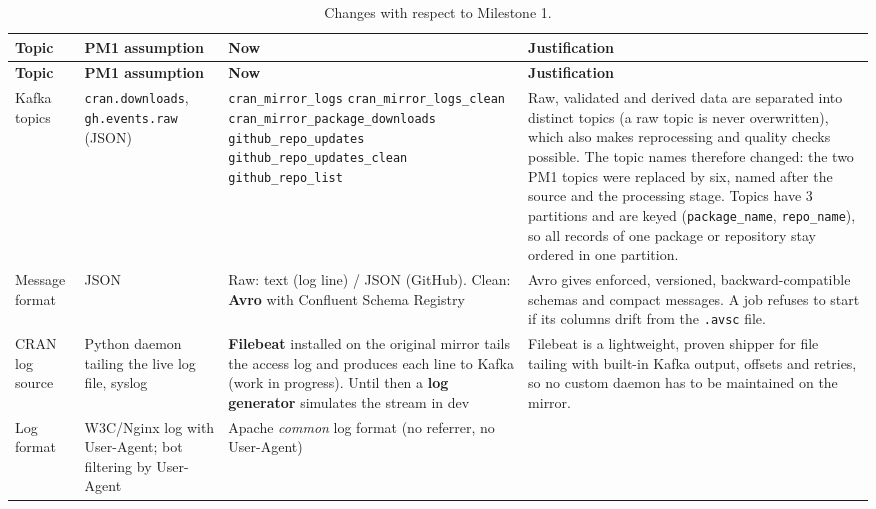 \documentclass[11pt,a4paper]{article}
\begin{document}
{\footnotesize
\begin{longtable}{@{}L{1.8cm}L{2.3cm}L{4.3cm}L{6.3cm}@{}}
\caption{Changes with respect to Milestone 1.}\\
\toprule
\textbf{Topic} & \textbf{PM1 assumption} & \textbf{Now} & \textbf{Justification} \\
\midrule
\endfirsthead
\toprule
\textbf{Topic} & \textbf{PM1 assumption} & \textbf{Now} & \textbf{Justification} \\
\midrule
\endhead
\bottomrule
\endfoot
Kafka topics &
  \texttt{cran.downloads}, \texttt{gh.events.raw} (JSON) &
  {\scriptsize\texttt{cran\_mirror\_logs}}\newline
  {\scriptsize\texttt{cran\_mirror\_logs\_clean}}\newline
  {\scriptsize\texttt{cran\_mirror\_package\_downloads}}\newline
  {\scriptsize\texttt{github\_repo\_updates}}\newline
  {\scriptsize\texttt{github\_repo\_updates\_clean}}\newline
  {\scriptsize\texttt{github\_repo\_list}} &
  Raw, validated and derived data are separated into distinct topics (a raw topic is never overwritten),
  which also makes reprocessing and quality checks possible. The topic names therefore changed: the two PM1 topics
  were replaced by six, named after the source and the processing stage. Topics have 3 partitions and are keyed
  (\texttt{package\_\allowbreak{}name}, \texttt{repo\_\allowbreak{}name}), so all records of one package or repository stay
  ordered in one partition. \\
\midrule[0.3pt]
Message format &
  JSON &
  Raw: text (log line) / JSON (GitHub). Clean: \textbf{Avro} with Confluent Schema Registry &
  Avro gives enforced, versioned, backward-compatible schemas and compact messages. A job refuses to
  start if its columns drift from the \texttt{.avsc} file. \\
\midrule[0.3pt]
CRAN log source &
  Python daemon tailing the live log file, syslog &
  \textbf{Filebeat} installed on the original mirror tails the access log and produces each line to Kafka (work in progress). Until then a \textbf{log generator} simulates the stream in dev &
  Filebeat is a lightweight, proven shipper for file tailing with built-in Kafka output, offsets and retries, so no custom daemon has to be maintained on the mirror. \\
\midrule[0.3pt]
Log format &
  W3C/Nginx log with User-Agent; bot filtering by User-Agent &
  Apache \emph{common} log format (no referrer, no User-Agent) &

\end{longtable}}
\end{document}

